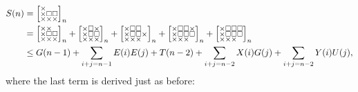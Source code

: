 \documentclass[a4paper,12pt]{article}
\makeatletter
\newenvironment{grid}
  {\begingroup\footnotesize
   \renewcommand{\arraystretch}{0}
   \setlength{\arraycolsep}{0pt}
   \left[\begin{array}{@{}*{10}{c}@{}}}
  {\end{array}\right]\endgroup}
\newcommand{\void}{\phantom{\times}}
\newcommand{\myS}{
    \begin{grid}
        \times & \void & \void \\
        \times & \square & \square \\
        \times & \times & \times
    \end{grid}
}
\makeatother
\begin{document}
    
    \begin{align*}
	S(n) &= \myS_n \\
		&= \begin{grid}
        \times & \times & \void \\
        \times & \square & \square \\
        \times & \times & \times
    \end{grid}_n + \begin{grid}
        \times & \square & \times \\
        \times & \square & \square \\
        \times & \times & \times
    \end{grid}_n +  \begin{grid}
	    \times & \square & \square & \void \\
		\times & \square & \square & \times \\
			\times & \times & \times & \void
    \end{grid}_n +  \begin{grid}
	    \times & \square & \square & \times \\
		\times & \square & \square & \square \\
			\times & \times & \times & \void
    \end{grid}_n + \begin{grid}
	    \times & \square & \square & \square \\
		\times & \square & \square & \square \\
			\times & \times & \times & \void
    \end{grid}_n \\
	&\le G(n-1)
	      + \sum_{i+j=n-1} E(i)E(j)
	      + T(n-2)
	      + \sum_{i+j=n-2} X(i)G(j)
	      + \sum_{i+j=n-2} Y(i)U(j),
	\end{align*}
    where the last term is derived just as before:
\end{document}
